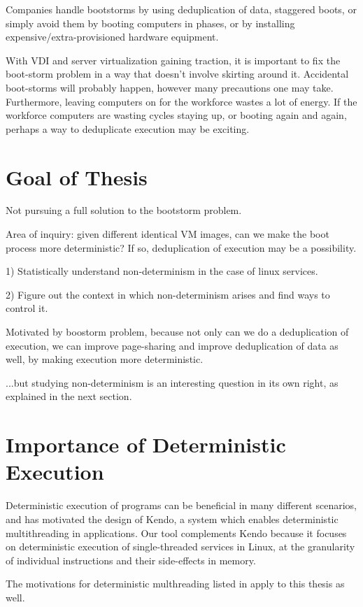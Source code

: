 Companies handle bootstorms by using deduplication of data,
staggered boots, or simply avoid them by booting computers in
phases, or by installing expensive/extra-provisioned hardware
equipment. 

With VDI and server virtualization gaining traction, it is
important to fix the boot-storm problem in a way that doesn't 
involve skirting around it. Accidental boot-storms will
probably happen, however many precautions one may take. Furthermore,
leaving computers on for the workforce wastes a lot of energy.
If the workforce computers are wasting cycles staying up,
or booting again and again, perhaps a way to deduplicate 
execution may be exciting.

\section{Goal of Thesis}

Not pursuing a full solution to the bootstorm problem.

Area of inquiry: given different identical VM images, can we 
make the boot process more deterministic? If so, 
deduplication of execution may be a possibility.

1) Statistically understand non-determinism 
in the case of linux services.

2) Figure out the context in which non-determinism
arises and find ways to control it.

Motivated by boostorm problem, because not only can we
do a deduplication of execution, we can improve
page-sharing and improve deduplication of data as well,
by making execution more deterministic.

...but studying non-determinism is an interesting question in its
own right, as explained in the next section.

\section{Importance of Deterministic Execution}\label{ch1:whydeterminism}

Deterministic execution of programs can be beneficial in many
different scenarios, and has motivated the design of Kendo,
a system which enables deterministic multithreading
in applications\cite{}. Our tool complements Kendo because 
it focuses on deterministic execution of single-threaded services in Linux,
at the granularity of individual instructions and their side-effects in
memory.

The motivations for deterministic multhreading listed in
\cite{} apply to this thesis as well.

